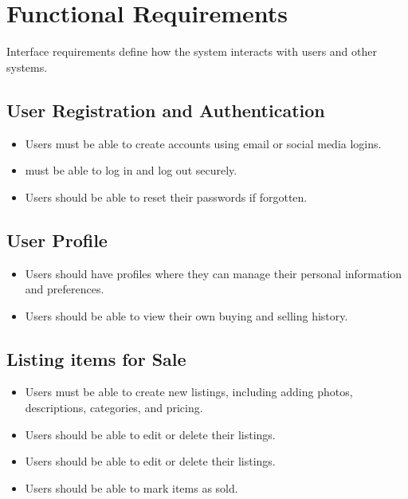 \section{Functional Requirements}
Interface requirements define how the system interacts with users and other systems.

\subsection{User Registration and Authentication}
\begin{itemize}
        \item Users must be able to create accounts using email or social media logins.
    
        \item must be able to log in and log out securely.

        \item Users should be able to reset their passwords if forgotten.
\end{itemize}

\subsection{User Profile}
\begin{itemize}
        \item Users should have profiles where they can manage their personal information and preferences.
    
        \item Users should be able to view their own buying and selling history.
\end{itemize}

\subsection{Listing items for Sale}
\begin{itemize}
        \item Users must be able to create new listings, including adding photos, descriptions, categories, and pricing.
    
        \item Users should be able to edit or delete their listings.
        \item Users should be able to edit or delete their listings.
        \item Users should be able to mark items as sold.
\end{itemize}

